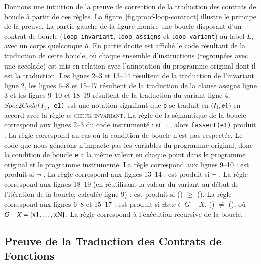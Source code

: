 Donnons une intuition de la preuve de correction de la traduction des
contrats de boucle à partir de ces règles.
La figure~\ref{fig:proof-loop-contract} illustre le principe de la preuve.
La partie gauche de la figure montre une boucle disposant d'un contrat de boucle
(\lstinline'loop invariant', \lstinline'loop assigns' et
\lstinline'loop variant') au label $L$, avec un corps quelconque \lstinline'A'.
En partie droite est affiché le code résultant de la traduction de cette
boucle, où chaque ensemble d'instructions (regroupées avec une accolade) est
mis en relation avec l'annotation du programme original dont il est la
traduction.
Les lignes 2--3 et 13--14 résultent de la traduction de l'invariant ligne 2,
les lignes 6--8 et 15--17 résultent de la traduction de la clause assigns ligne
3 et les lignes 9--10 et 18--19 résultent de la traduction du variant ligne 4.
$Spec2Code$\lstinline'('$I_1$\lstinline', e1)' est une notation signifiant que
\lstinline'p' se traduit en $(I_1, \mbox{\lstinline'e1'})$ en accord avec la
règle \textsc{$\alpha$-check-invariant}.
La règle  de la sémantique de la boucle correspond aux
lignes 2--3 du code instrumenté : si $\lnot$ , alors
\lstinline'fassert(e1)' produit \errorenv.
La règle  correspond au cas où la condition de boucle n'est
pas respectée.
Le code que nous générons n'impacte pas les variables
du programme original, donc la condition de boucle \lstinline'e' a la même
valeur en chaque point dans le programme original et le programme instrumenté.
La règle  correspond aux lignes 9--10 : \errorenv est
produit si $\lnot$ .
La règle  correspond aux lignes 13--14 : \errorenv est
produit si $\lnot$ .
La règle  correspond aux lignes 18--19 (en réutilisant
la valeur du variant au début de l'itération de la boucle, calculée ligne 9) :
\errorenv est produit si () $\ge$
 ().
La règle  correspond aux lignes 6--8 et 15--17 :
\errorenv est produit si $\exists x. x \in G-X.$
() $\ne$  (),
où $G-X = \{\mbox{\lstinline'x1'},\ldots,\mbox{\lstinline'xN'}\}$.
La règle  correspond à l'exécution récursive de la boucle.





\subsection{Preuve de la Traduction des Contrats de Fonctions}

